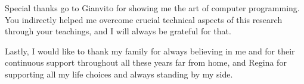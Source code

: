 \vspace{0.2cm}
Special thanks go to Gianvito for showing me the art of computer programming. You indirectly helped me overcome crucial technical aspects of this research through your teachings, and I will always be grateful for that.

\vspace{0.2cm}
Lastly, I would like to thank my family for always believing in me and for their continuous support throughout all these years far from home, and Regina for supporting all my life choices and always standing by my side.

\endgroup